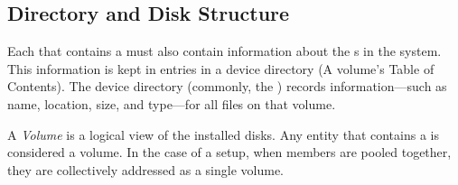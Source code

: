 \subsection{Directory and Disk Structure}\label{subsec:Directory_Disk_Structure}
Each  that contains a  must also contain information about the s in the system.
This information is kept in entries in a device directory (A volume's Table of Contents).
The device directory (commonly, the ) records information—such as name, location, size, and type—for all files on that volume.

\begin{definition}[Volume]\label{def:Volume}
  A \emph{Volume} is a logical view of the installed disks.
  Any entity that contains a  is considered a volume.
  In the case of a  setup, when members are pooled together, they are collectively addressed as a single volume.
\end{definition}



